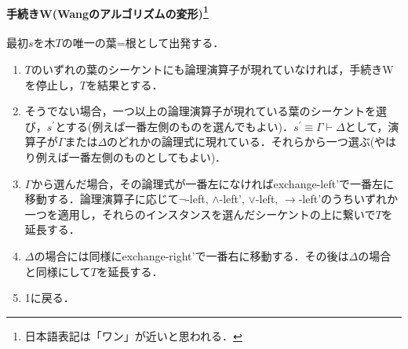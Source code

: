 \documentclass{ltjsarticle}
\theoremstyle{mystyle1}
\theoremstyle{mystyle3}
\theoremstyle{mystyle2}
\begin{document}
\paragraph{手続きW(Wangのアルゴリズムの変形)\footnote{日本語表記は「ワン」が近いと思われる．}}
最初$s$を木$T$の唯一の葉=根として出発する．
\begin{enumerate}
  \item $T$のいずれの葉のシーケントにも論理演算子が現れていなければ，手続きWを停止し，$T$を結果とする．
  \item そうでない場合，一つ以上の論理演算子が現れている葉のシーケントを選び，$s^\prime$とする(例えば一番左側のものを選んでもよい)．$s^\prime\equiv\Gamma\vdash\Delta$として，演算子が$\Gamma$または$\Delta$のどれかの論理式に現れている．それらから一つ選ぶ(やはり例えば一番左側のものとしてもよい)．
  \item $\Gamma$から選んだ場合，その論理式が一番左になければexchange-left'で一番左に移動する．論理演算子に応じて$\neg$-left, $\wedge$-left', $\vee$-left, $\to$-left'のうちいずれか一つを適用し，それらのインスタンスを選んだシーケントの上に繋いで$T$を延長する．
  \item $\Delta$の場合には同様にexchange-right'で一番右に移動する．その後は$\Delta$の場合と同様にして$T$を延長する．
  \item 1に戻る．
\end{enumerate}
\end{document}

